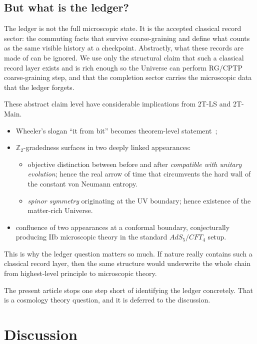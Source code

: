 \documentclass[
  aps,
  prd,
  onecolumn,
  notitlepage,
  nofootinbib,
  superscriptaddress,
  10pt
]{revtex4-2}
\theoremstyle{definition}
\theoremstyle{plain}
\begin{document}
\subsection{But what is the ledger?}
\label{subsec:what-is-ledger}
The ledger is not the full microscopic state.  It is the accepted classical
record sector: the commuting facts that survive coarse-graining and define what
counts as the same visible history at a checkpoint.  Abstractly, what these records are made of can be ignored.  We use only the
structural claim that such a classical record layer exists and is rich enough so the Universe can perform RG/CPTP coarse-graining step, and that the completion sector carries the microscopic data that the ledger forgets.

These abstract claim level have considerable implications from 2T-LS and 2T-Main. 
\begin{itemize}
\item Wheeler's slogan ``it from bit'' becomes theorem-level statement~\cite{Wheeler1990ItFromBit};
\item $\mathbb{Z}_2$-gradedness surfaces in two deeply linked appearances:
\begin{itemize}
  \item objective distinction between before and after \emph{compatible with unitary evolution}; hence the real arrow of time that circumvents the hard wall of the constant von Neumann entropy.
  \item \emph{spinor symmetry} originating at the UV boundary; hence existence of the matter-rich Universe.
\end{itemize}
\item confluence of two appearances at a conformal boundary, conjecturally producing IIb microscopic theory in the standard $AdS_5/CFT_4$ setup.
\end{itemize}

This is why the ledger question matters so much.  If nature really contains
such a classical record layer, then the same structure would underwrite the whole chain from highest-level principle to microscopic theory.  

The present article stops one step short of identifying the ledger concretely.  That is a cosmology theory
question, and it is deferred to the discussion.

\section{Discussion}
\label{sec:discussion}
\end{document}
